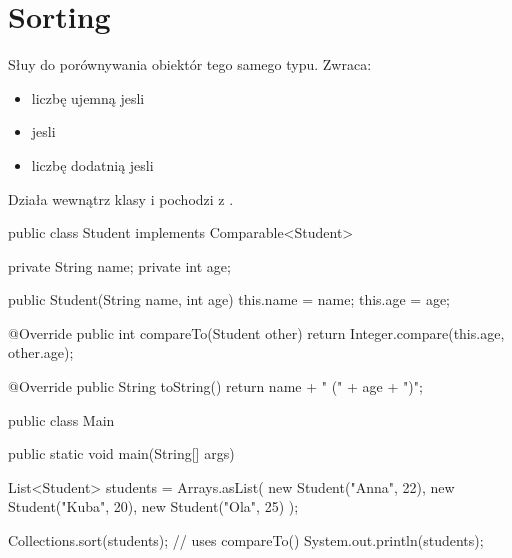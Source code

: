 
\section{Sorting}
\begin{tcolorbox}[gray, title={\rCode{compareTo(T o)}}]

    Słuy do porównywania obiektór tego samego typu. Zwraca:
    \begin{itemize}
        \item liczbę ujemną jesli 
        \item {} jesli 
        \item liczbę dodatnią jesli 
    \end{itemize}
    Działa wewnątrz klasy i pochodzi z .

   \begin{java}
        public class Student implements Comparable<Student> {
        private String name;
        private int age;

        public Student(String name, int age) {
            this.name = name;
            this.age = age;
        }

        @Override
        public int compareTo(Student other) {
            return Integer.compare(this.age, other.age);
        }

        @Override
        public String toString() {
            return name + " (" + age + ")";
        }
    }

    public class Main {
        public static void main(String[] args) {
            List<Student> students = Arrays.asList(
                new Student("Anna", 22),
                new Student("Kuba", 20),
                new Student("Ola", 25)
            );

            Collections.sort(students); // uses compareTo()
            System.out.println(students);
        }
    }

    \end{java}
\end{tcolorbox}


